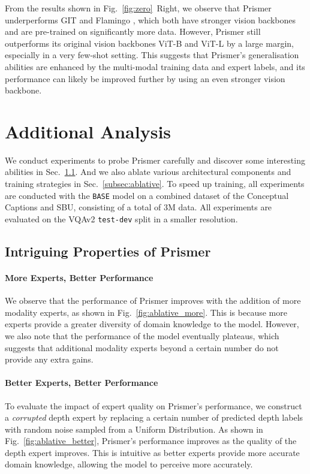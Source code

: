 \documentclass[11pt]{article}
\begin{document}
{From the results shown in Fig.~\ref{fig:zero}~Right, we observe that Prismer underperforms GIT \cite{wang2022git} and Flamingo \cite{alayrac2022flamingo}, which both have stronger vision backbones and are pre-trained on significantly more data. However, Prismer still outperforms its original vision backbones ViT-B and ViT-L by a large margin, especially in a very few-shot setting. This suggests that Prismer's generalisation abilities are enhanced by the multi-modal training data and expert labels, and its performance can likely be improved further by using an even stronger vision backbone.

\section{Additional Analysis}
We conduct experiments to probe Prismer carefully and discover some interesting abilities in Sec.~\ref{sec:intriguing}. And we also ablate various architectural components and training strategies in Sec.~\ref{subsec:ablative}. To speed up training, all experiments are conducted with the {\tt BASE} model on a combined dataset of the Conceptual Captions and SBU, consisting of a total of 3M data. All experiments are evaluated on the VQAv2 {\tt test-dev} split in a smaller  resolution.

\subsection{Intriguing Properties of Prismer}
\label{sec:intriguing}
\paragraph{More Experts, Better Performance} We observe that the performance of Prismer improves with the addition of more modality experts, as shown in Fig.~\ref{fig:ablative_more}. This is because more experts provide a greater diversity of domain knowledge to the model. However, we also note that the performance of the model eventually plateaus, which suggests that additional modality experts beyond a certain number do not provide any extra gains.

\paragraph{Better Experts, Better Performance} To evaluate the impact of expert quality on Prismer's performance, we construct a \textit{corrupted} depth expert by replacing a certain number of predicted depth labels with random noise sampled from a Uniform Distribution. As shown in Fig.~\ref{fig:ablative_better}, Prismer's performance improves as the quality of the depth expert improves. This is intuitive as better experts provide more accurate domain knowledge, allowing the model to perceive more accurately.

}
\end{document}
